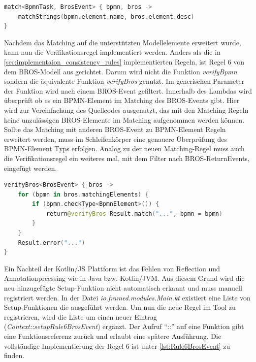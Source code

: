 \begin{lstlisting}[language=Kotlin, caption=Matching Regel zwischen BPMN-Activities und BROS-Events, label=lst:matching_activity_event]
match<BpmnTask, BrosEvent> { bpmn, bros ->
    matchStrings(bpmn.element.name, bros.element.desc)
}
\end{lstlisting}

Nachdem das Matching auf die unterstützten Modellelemente erweitert wurde, kann nun die Verifikationsregel implementiert werden.
Anders als die in \cref{sec:implementaion_consistency_rules} implementierten Regeln, ist Regel 6 von dem BROS-Modell aus gerichtet.
Darum wird nicht die Funktion \emph{verifyBpmn} sondern die äquivalente Funktion \emph{verifyBros} genutzt.
Im generischen Parameter der Funktion wird nach einem BROS-Event gefiltert.
Innerhalb des Lambdas wird überprüft ob es ein BPMN-Element im Matching des BROS-Events gibt.
Hier wird zur Vereinfachung des Quellcodes ausgenutzt, das mit den Matching Regeln keine unzulässigen BROS-Elemente im Matching aufgenommen werden können.
Sollte das Matching mit anderen BROS-Event zu BPMN-Element Regeln erweitert werden, muss im Schleifenkörper eine genauere Überprüfung des BPMN-Element Typs erfolgen.
Analog zu der neuen Matching-Regel muss auch die Verifikationsregel ein weiteres mal, mit dem Filter nach BROS-ReturnEvents, eingefügt werden.

\begin{lstlisting}[language=Kotlin, caption=Implementierung von Regel 6, label=lst:implementation_rule_6]
verifyBros<BrosEvent> { bros ->
    for (bpmn in bros.matchingElements) {
        if (bpmn.checkType<BpmnElement>()) {
            return@verifyBros Result.match("...", bpmn = bpmn)
        }
    }
    Result.error("...")
}
\end{lstlisting}

Ein Nachteil der Kotlin/JS Plattform ist das Fehlen von Reflection und Annotationprcessing wie in Java bzw. Kotlin/JVM.
Aus diesem Grund wird die neu hinzugefügte Setup-Funktion nicht automatisch erkannt und muss manuell registriert werden.
In der Datei \emph{io.framed.modules.Main.kt} existiert eine Liste von Setup-Funktionen die ausgeführt werden.
Um nun die neue Regel im Tool zu registrieren, wird die Liste um einen neuer Eintrag (\emph{Context::setupRule6BrosEvent}) ergänzt.
Der Aufruf ``::'' auf eine Funktion gibt eine Funktionsreferenz zurück und erlaubt eine spätere Ausführung.
Die vollständige Implementierung der Regel 6 ist unter \cref{lst:Rule6BrosEvent} zu finden.
